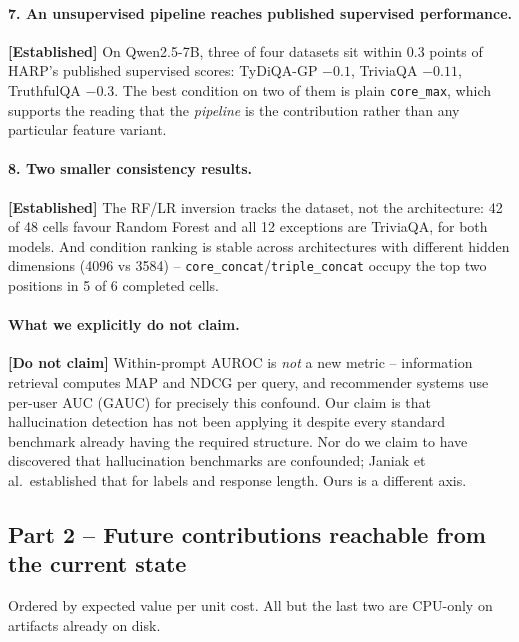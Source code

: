 \documentclass[11pt,a4paper]{article}
\begin{document}
\paragraph{7. An unsupervised pipeline reaches published supervised performance.}
\textbf{[Established]} On Qwen2.5-7B, three of four datasets sit within 0.3 points of HARP's
published supervised scores: TyDiQA-GP $-0.1$, TriviaQA $-0.11$, TruthfulQA $-0.3$. The best
condition on two of them is plain \texttt{core\_max}, which supports the reading that the
\emph{pipeline} is the contribution rather than any particular feature variant.

\paragraph{8. Two smaller consistency results.} \textbf{[Established]} The RF/LR inversion tracks
the dataset, not the architecture: 42 of 48 cells favour Random Forest and all 12 exceptions are
TriviaQA, for both models. And condition ranking is stable across architectures with different
hidden dimensions (4096 vs 3584) -- \texttt{core\_concat}/\texttt{triple\_concat} occupy the top two
positions in 5 of 6 completed cells.

\paragraph{What we explicitly do not claim.} \textbf{[Do not claim]} Within-prompt AUROC is
\emph{not} a new metric -- information retrieval computes MAP and NDCG per query, and recommender
systems use per-user AUC (GAUC) for precisely this confound. Our claim is that hallucination
detection has not been applying it despite every standard benchmark already having the required
structure. Nor do we claim to have discovered that hallucination benchmarks are confounded;
Janiak et al.\ established that for labels and response length. Ours is a different axis.

\subsection*{Part 2 -- Future contributions reachable from the current state}

Ordered by expected value per unit cost. All but the last two are CPU-only on artifacts already on
disk.
\end{document}

